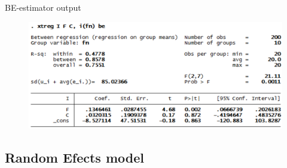 \begin{frame}{BE-estimator output}
	\begin{figure}
		\centering
		\includegraphics[width = \linewidth]{figures/panel_06.png}
	\end{figure}
\end{frame}

\subsection{Random Efects model}

